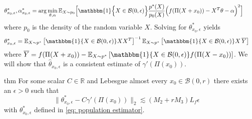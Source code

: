 \documentclass[11pt]{article}
\begin{document}
\begin{align}
\theta^*_{x_0, \epsilon}, \alpha^*_{x_0, \epsilon} &= \arg\min_{\theta, \alpha} \mathbb{E}_{X\sim p_0} \Big[\mathbbm{1}\Big\{X \in \mathcal{B}(0, \epsilon)\Big\}\frac{p^*(X)}{p_0(X)}\Big(f(\Pi(X + x_0)) - X^{T}\theta - \alpha \Big)^2\Big] \label{eq: population estimator}
\end{align}
where $p_0$ is the density of the random variable $X$. Solving for $\theta^*_{x_0, \epsilon}$ yields
\begin{align}
    \theta^*_{x_0, \epsilon} = \mathbb{E}_{X \sim p^*}\left[\mathbbm{1}\{X \in \mathcal{B}(0, \epsilon)\}XX^T\right]^{-1}\mathbb{E}_{X \sim p^*}\left[\mathbbm{1}\{X \in \mathcal{B}(0, \epsilon)\}X\,\overline{Y}\right] \label{eq: population est closed form}
\end{align}
where $\overline{Y} = f(\Pi(X+x_0)) - \mathbb{E}_{X \sim p^*}\left[\mathbbm{1}\{X \in \mathcal{B}(0, \epsilon)\}f(\Pi(X - x_0))\right]$. We will show that $\widehat{\theta}_{x_0,\epsilon}$ is a consistent estimate of $\gamma'(\Pi(x_0))$.



\begin{restatable}{thm}{}
    For some scalar $C \in \mathbb{R}$ and Lebesgue almost every $x_0 \in \mathcal{B}(0, r)$ there exists an $\epsilon > 0$ such that 
    \[\|\theta^*_{x_0, \epsilon} - C\gamma'(\Pi(x_0))\|_2 \lesssim (M_2+rM_3)L_f\epsilon\]
    with $\theta^*_{x_0, \epsilon}$ defined in \cref{eq: population estimator}.
\end{restatable}
\end{document}
